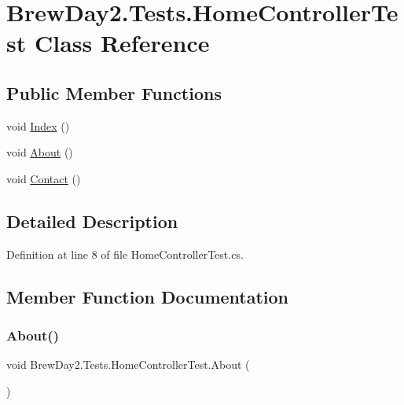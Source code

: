 \hypertarget{class_brew_day2_1_1_tests_1_1_home_controller_test}{}\section{Brew\+Day2.\+Tests.\+Home\+Controller\+Test Class Reference}
\label{class_brew_day2_1_1_tests_1_1_home_controller_test}
\subsection*{Public Member Functions}
\begin{DoxyCompactItemize}
\item 
void \mbox{\hyperlink{class_brew_day2_1_1_tests_1_1_home_controller_test_af1900233c3a196c192c2c56776891fc3}{Index}} ()
\item 
void \mbox{\hyperlink{class_brew_day2_1_1_tests_1_1_home_controller_test_afa41dc737f6e2be09bd67e244e83d95e}{About}} ()
\item 
void \mbox{\hyperlink{class_brew_day2_1_1_tests_1_1_home_controller_test_a83be45e471f422fbed1c51d8f5328567}{Contact}} ()
\end{DoxyCompactItemize}


\subsection{Detailed Description}


Definition at line 8 of file Home\+Controller\+Test.\+cs.



\subsection{Member Function Documentation}
\mbox{\label{class_brew_day2_1_1_tests_1_1_home_controller_test_afa41dc737f6e2be09bd67e244e83d95e}} 
\subsubsection{\texorpdfstring{About()}{About()}}
{\footnotesize\ttfamily void Brew\+Day2.\+Tests.\+Home\+Controller\+Test.\+About (\begin{DoxyParamCaption}{ }\end{DoxyParamCaption})}



